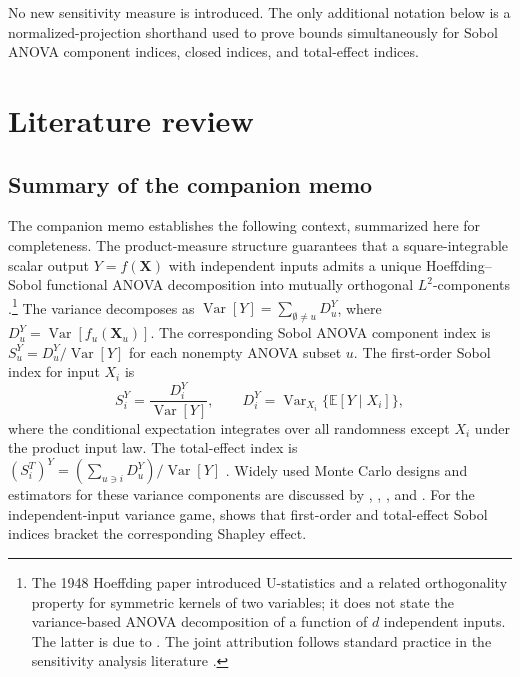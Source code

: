 \documentclass[11pt,letterpaper]{article}
\DeclareMathOperator{\Var}{Var}
\newcommand{\E}{\mathbb{E}}
\newcommand{\bX}{\boldsymbol{X}}
\theoremstyle{remark}
\begin{document}
No new sensitivity measure is introduced. The only additional notation below is
a normalized-projection shorthand used to prove bounds simultaneously for Sobol
ANOVA component indices, closed indices, and total-effect indices.

\section{Literature review}
\label{sec:lit}

\subsection{Summary of the companion memo}

The companion memo establishes the following context, summarized here for
completeness. The product-measure structure guarantees that a square-integrable
scalar output $Y=f(\bX)$ with independent inputs admits a unique
Hoeffding--Sobol functional ANOVA decomposition into mutually orthogonal
$L^2$-components \citep{Hoeffding1948,Sobol1993}.\footnote{The 1948 Hoeffding
paper introduced U-statistics and a related orthogonality property for symmetric
kernels of two variables; it does not state the variance-based ANOVA decomposition
of a function of $d$ independent inputs. The latter is due to \citet{Sobol1993}.
The joint attribution follows standard practice in the sensitivity analysis
literature \citep[e.g.,][]{Saltelli2008}.}
The variance decomposes as
$\Var[Y]=\sum_{\emptyset\neq u}D_u^Y$, where $D_u^Y=\Var[f_u(\bX_u)]$.
The corresponding Sobol ANOVA component index is
$S_u^Y=D_u^Y/\Var[Y]$ for each nonempty ANOVA subset $u$.
The first-order Sobol index for input $X_i$ is \citep{Sobol1993}
\begin{equation}
  S_i^Y=\frac{D_i^Y}{\Var[Y]},\qquad D_i^Y=\Var_{X_i}\{\E[Y\mid X_i]\},
  \label{eq:sobol_def}
\end{equation}
where the conditional expectation integrates over all randomness except $X_i$
under the product input law. The total-effect index is
$(S_i^T)^Y=(\sum_{u\ni i}D_u^Y)/\Var[Y]$ \citep{Homma1996}. Widely used
Monte Carlo designs and estimators for these variance components are discussed
by \citet{Saltelli2002}, \citet{Jansen1999}, \citet{Saltelli2008}, and
\citet{Saltelli2010}. For the independent-input variance game,
\citet{Owen2014} shows that first-order and total-effect Sobol indices bracket
the corresponding Shapley effect.
\end{document}
